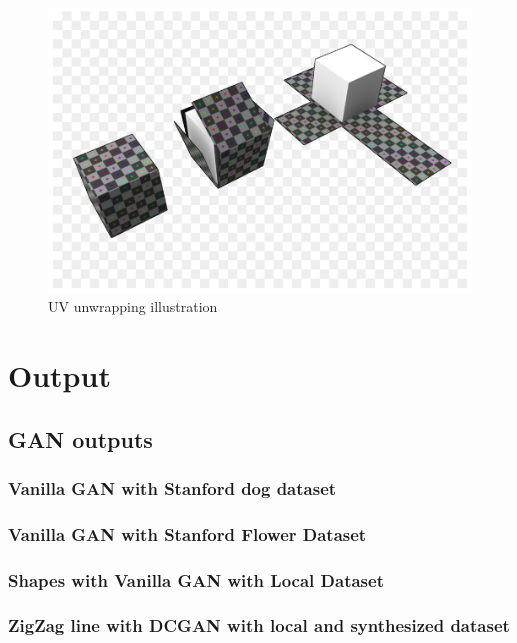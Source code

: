 \documentclass{article}
\begin{document}
\begin{figure}[H]
    \centering
    \includegraphics[width=15cm]{images/UVUnwrapping.png}
    \caption{UV unwrapping illustration}
    \label{fig:my_label}
\end{figure}


    
\newpage    
\section{Output}

\subsection{GAN outputs}

\subsubsection{Vanilla GAN with Stanford dog dataset}

\subsubsection{Vanilla GAN with Stanford Flower Dataset}

\subsubsection{Shapes with Vanilla GAN with Local Dataset}

\subsubsection{ZigZag line with DCGAN with local and synthesized dataset}
\end{document}
